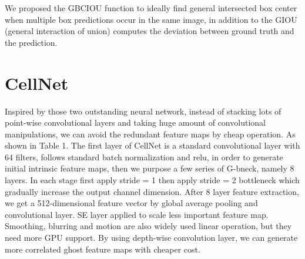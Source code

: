 We proposed the GBCIOU function to ideally find general intersected box center when multiple box predictions occur in the same image, in addition to the GIOU (general interaction of union) computes the deviation between ground truth and the prediction.

\section{CellNet}
\label{sec:ipsum}
Inspired by those two outstanding neural network\cite{b19}\cite{b20}, instead of stacking lots of point-wise convolutional layers and taking huge amount of convolutional manipulations, we can avoid the redundant feature maps by cheap operation. 
As shown in Table 1. The first layer of CellNet is a standard convolutional layer with 64 filters, follows standard batch normalization and relu, in order to generate initial intrinsic feature maps, then we purpose a few series of G-bneck, namely 8 layers. In each stage first apply stride = 1 then apply stride = 2 bottleneck which gradually increase the output channel dimension. After 8 layer feature extraction, we get a 512-dimensional feature vector by global average pooling and convolutional layer. SE layer applied to scale less important feature map. Smoothing, blurring and motion are also widely used linear operation, but they need more GPU support. By using depth-wise convolution layer, we can generate more correlated ghost feature maps with cheaper cost.

